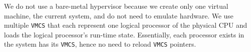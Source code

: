 


We do not use a bare-metal hypervisor because we create only one virtual machine, the current system, and do not need to emulate hardware. We use multiple \texttt{VMCS} that each represent one logical processor of the physical CPU and loads the logical processor's run-time state. Essentially, each processor exists in the system has its \texttt{VMCS}, hence no need to reload \texttt{VMCS} pointers.

